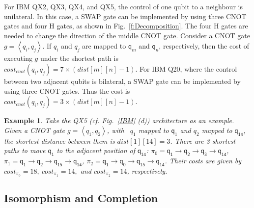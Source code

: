 \documentclass[journal]{IEEEtran}
\newtheorem{example}{Example}
\begin{document}
	For IBM QX2, QX3, QX4, and QX5, the control of one qubit to a neighbour is unilateral. In this case, 
	a SWAP gate can be implemented by using three CNOT gates and four H gates, as shown in Fig.~\ref{f:Decomposition}. The four H gates are needed to change the direction of the middle CNOT gate. 
	Consider a CNOT gate $g=\left \langle  \textit{q}_\textit{i},\textit{q}_\textit{j} \right \rangle $. If $q_i$ and $q_j$  are mapped to $\textsf{q}_{m}$ and $\textsf{q}_{n}$, respectively, then the cost of executing $g$ under the shortest path is $cost_{cnot}(\textit{q}_\textit{i},\textit{q}_\textit{j})=7 \times( dist[m][n]-1)$. For IBM Q20, where the control between two adjacent qubits is bilateral, a SWAP gate can be implemented by using three CNOT gates. Thus the cost  is $cost_{cnot}(\textit{q}_\textit{i},\textit{q}_\textit{j})=3 \times( dist[m][n]-1)$. 
	\begin{example}
		Take the QX5 (cf. Fig.~\ref{IBM} (d)) architecture  as an example. Given a CNOT gate $g=\left \langle  \textit{q}_\textit{1}, \textit{q}_\textit{2} \right \rangle $, with \ $\textit{q}_\textit{1}$ mapped to $\textsf{q}_{1}$ and $\textit{q}_\textit{2}$ mapped to $\textsf{q}_{\textsf{14}}$, the shortest distance between them  is $dist[1][14]=3$. There are 3 shortest paths to move $\textsf{q}_{\textsf{1}}$ to the adjacent position of 
		$\textsf{q}_{\textsf{14}}$:
		$\pi_{0}={\textsf{q}_{\textsf{1}}\rightarrow \textsf{q}_{\textsf{2}} \rightarrow \textsf{q}_{\textsf{3}} \rightarrow \textsf{q}_{\textsf{14}}}$,
		$\pi_{1}={\textsf{q}_{\textsf{1}}\rightarrow \textsf{q}_{\textsf{2}} \rightarrow \textsf{q}_{\textsf{15}} \rightarrow \textsf{q}_{\textsf{14}}}$,
		$\pi_{2}={\textsf{q}_{\textsf{1}}\rightarrow \textsf{q}_{\textsf{0}} \rightarrow \textsf{q}_{\textsf{15}} \rightarrow \textsf{q}_{\textsf{14}}}$.
		Their costs are given by 
		$cost_{\pi_{0}}=18,\ cost_{\pi_{1}}=14,$ and $ cost_{\pi_{2}}=14$, respectively.
	\end{example}
	
	
	
	\subsection{Isomorphism and Completion}
	
\end{document}
